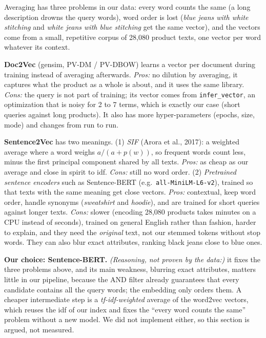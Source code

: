 \documentclass[10pt,a4paper]{article}
\newcommand{\reasoning}[1]{\textit{(Reasoning, not proven by the data:)} #1}
\begin{document}
Averaging has three problems in our data: every word counts the same (a long description drowns the
query words), word order is lost (\emph{blue jeans with white stitching} and \emph{white jeans with blue
stitching} get the same vector), and the vectors come from a small, repetitive corpus of 28,080 product
texts, one vector per word whatever its context.

\textbf{Doc2Vec} (gensim, PV-DM / PV-DBOW) learns a vector per document during training instead of
averaging afterwards. \emph{Pros:} no dilution by averaging, it captures what the product as a whole is
about, and it uses the same library. \emph{Cons:} the query is not part of training; its vector comes from
\texttt{infer\_vector}, an optimization that is noisy for 2 to 7 terms, which is exactly our case (short
queries against long products). It also has more hyper-parameters (epochs, size, mode) and changes from
run to run.

\textbf{Sentence2Vec} has two meanings. (1) \emph{SIF} (Arora et al., 2017): a weighted average where a word
weighs $a/(a+p(w))$, so frequent words count less, minus the first principal component shared by all
texts. \emph{Pros:} as cheap as our average and close in spirit to idf. \emph{Cons:} still no word order.
(2) \emph{Pretrained sentence encoders} such as Sentence-BERT (e.g.\ \texttt{all-MiniLM-L6-v2}), trained so
that texts with the same meaning get close vectors. \emph{Pros:} contextual, keep word order, handle
synonyms (\emph{sweatshirt} and \emph{hoodie}), and are trained for short queries against longer texts.
\emph{Cons:} slower (encoding 28,080 products takes minutes on a CPU instead of seconds), trained on general
English rather than fashion, harder to explain, and they need the \emph{original} text, not our stemmed
tokens without stop words. They can also blur exact attributes, ranking black jeans close to blue ones.

\textbf{Our choice: Sentence-BERT.} \reasoning{it fixes the three problems above, and its main weakness,
blurring exact attributes, matters little in our pipeline, because the AND filter already guarantees that
every candidate contains all the query words; the embedding only orders them.} A cheaper intermediate
step is a \emph{tf-idf-weighted} average of the word2vec vectors, which reuses the idf of our index and
fixes the ``every word counts the same'' problem without a new model. We did not implement either, so
this section is argued, not measured.
\end{document}
